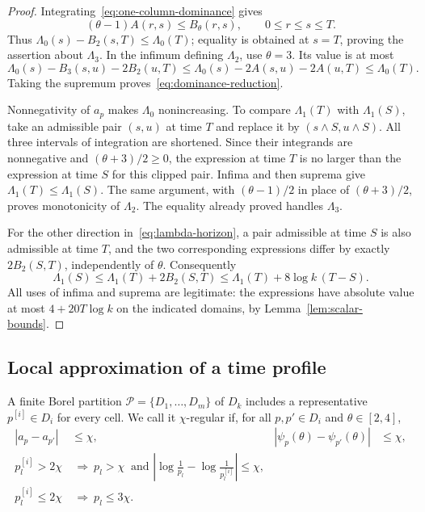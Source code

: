 \begin{proof}
Integrating~\eqref{eq:one-column-dominance} gives
\[
 (\theta-1)A(r,s)\le B_\theta(r,s),\qquad 0\le r\le s\le T.
\]
Thus $\Lambda_0(s)-B_2(s,T)\le\Lambda_0(T)$; equality is obtained at
$s=T$, proving the assertion about $\Lambda_3$. In the infimum defining
$\Lambda_2$, use $\theta=3$. Its value is at most
\[
 \Lambda_0(s)-B_3(s,u)-2B_2(u,T)
 \le\Lambda_0(s)-2A(s,u)-2A(u,T)
 \le\Lambda_0(T).
\]
Taking the supremum proves~\eqref{eq:dominance-reduction}.

Nonnegativity of $a_p$ makes $\Lambda_0$ nonincreasing. To compare
$\Lambda_1(T)$ with $\Lambda_1(S)$, take an admissible pair $(s,u)$ at
time $T$ and replace it by $(s\wedge S,u\wedge S)$. All three intervals
of integration are shortened. Since their integrands are nonnegative
and $(\theta+3)/2\ge0$, the expression at time $T$ is no larger than
the expression at time $S$ for this clipped pair. Infima and then
suprema give $\Lambda_1(T)\le\Lambda_1(S)$. The same argument, with
$(\theta-1)/2$ in place of $(\theta+3)/2$, proves monotonicity of
$\Lambda_2$. The equality already proved handles $\Lambda_3$.

For the other direction in~\eqref{eq:lambda-horizon}, a pair admissible
at time $S$ is also admissible at time $T$, and the two corresponding
expressions differ by exactly $2B_2(S,T)$, independently of $\theta$.
Consequently
\[
 \Lambda_1(S)\le\Lambda_1(T)+2B_2(S,T)
 \le\Lambda_1(T)+8\log k\,(T-S).
\]
All uses of infima and suprema are legitimate: the expressions have
absolute value at most $4+20T\log k$ on the indicated domains, by
Lemma~\ref{lem:scalar-bounds}.
\end{proof}

\subsection{Local approximation of a time profile}
\label{subsec:profile-approximation}

A finite Borel partition $\mathcal P=\{D_1,\ldots,D_m\}$ of $D_k$
includes a representative $p^{[i]}\in D_i$ for every cell. We call it
$\chi$-regular if, for all $p,p'\in D_i$ and $\theta\in[2,4]$,
\begin{align}\label{eq:partition-regularity}
 |a_p-a_{p'}|&\le\chi,&
 |\psi_p(\theta)-\psi_{p'}(\theta)|&\le\chi,\nonumber\\
 p^{[i]}_l>2\chi&\ \Longrightarrow\
 p_l>\chi\ \text{ and }\left|\log\frac1{p_l}-\log\frac1{p^{[i]}_l}\right|\le\chi,
 \nonumber\\
 p^{[i]}_l\le2\chi&\ \Longrightarrow\ p_l\le3\chi.
\end{align}

